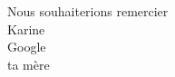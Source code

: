 \begin{center}
\vspace{8\baselineskip}
Nous souhaiterions remercier\\
\vspace*{2\baselineskip}
Karine\\
\vspace{1\baselineskip}
Google\\
\vspace{1\baselineskip}
ta mère\\


\end{center}
